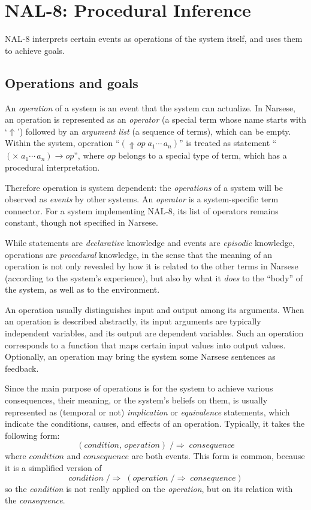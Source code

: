 
\chapter{NAL-8: Procedural Inference}

NAL-8 interprets certain events as operations of the system itself, and uses them to achieve goals.

\section{Operations and goals}

\begin{defi}
An {\em operation} of a system is an event that the system can actualize. In Narsese, an operation is represented as an \emph{operator} (a special term whose name starts with `$\Uparrow$') followed by an \emph{argument list} (a sequence of terms), which can be empty. Within the system, operation ``\((\Uparrow\!\!op \; a_1 \cdots \, a_n)\)'' is treated as statement ``\((\times \; a_1 \cdots \, a_n) \rightarrow op\)'', where $op$ belongs to a special type of term, which has a procedural interpretation.
\end{defi}

Therefore operation is system dependent: the \emph{operations} of a system will be observed as \emph{events} by other systems. An \emph{operator} is a system-specific term connector. For a system implementing NAL-8, its list of operators remains constant, though not specified in Narsese. 
 
While statements are \emph{declarative} knowledge and events are \emph{episodic} knowledge, operations are \emph{procedural} knowledge, in the sense that the meaning of an operation is not only revealed by how it is related to the other terms in Narsese (according to the system's experience), but also by what it \emph{does} to the ``body'' of the system, as well as to the environment. 

An operation usually distinguishes input and output among its arguments. When an operation is described abstractly, its input arguments are typically independent variables, and its output are dependent variables. Such an operation corresponds to a function that maps certain input values into output values. Optionally, an operation may bring the system some Narsese sentences as feedback.

Since the main purpose of operations is for the system to achieve various consequences, their meaning, or the system's beliefs on them, is usually represented as (temporal or not) \emph{implication} or \emph{equivalence} statements, which indicate the conditions, causes, and effects of an operation. Typically, it takes the following form:
\[(condition, \, operation) \; /\!\!\!\Rightarrow \; consequence\]
where $condition$ and $consequence$ are both events.  This form is common, because it is a simplified version of 
\[condition \; /\!\!\!\Rightarrow \; (operation \; /\!\!\!\Rightarrow \; consequence)\]
so the \emph{condition} is not really applied on the \emph{operation}, but on its relation with the \emph{consequence}.

